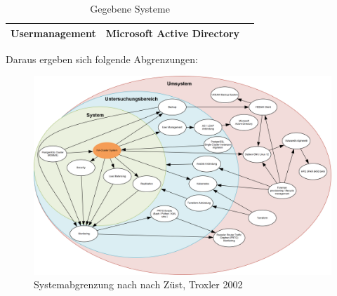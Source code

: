 \begin{table}[H]
{\begin{tabular}{lll}
    Usermanagement                            & Microsoft Active Directory                                                                  &                                                                                                                                                       \\ \hline
    \end{tabular}%
    }
    \caption{Gegebene Systeme}
    \label{tab:gegebene_systeme}
    \end{table}

    \clearpage
\begin{flushleft}
    Daraus ergeben sich folgende Abgrenzungen:
    \begin{figure}[H]
        \centering
        \includegraphics[width=0.75\linewidth]{source/introduction/delimitations/systemabgrenzungen}
        \caption{Systemabgrenzung nach nach Z\"ust, Troxler 2002\cite{EDGTQIKU}}
        \label{fig:systemabgrenzungen}
    \end{figure}
\end{flushleft}

